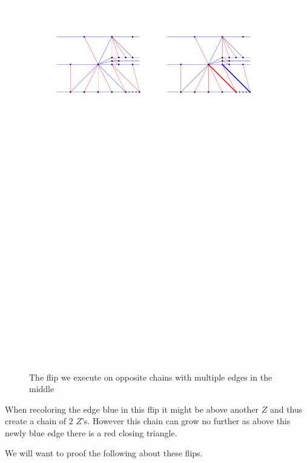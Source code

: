   \begin{figure}[h]
    \centering
    \includegraphics[width = \textwidth]{unifiedAlgo/img/post/oppMultiFlip}
    \caption{The flip we execute on opposite chains with multiple edges in the middle}
    \label{fig:uni:oppMultiFlip}
  \end{figure}

  When recoloring the edge blue in this flip it might be above another $Z$ and thus create a chain of $2$ $Z$'s. However this chain can grow no further as above this newly blue edge there is a red closing triangle.





  We will want to proof the following about these flips.

